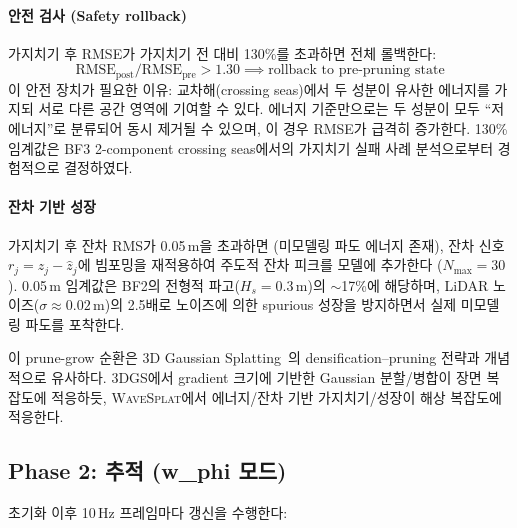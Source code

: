 \documentclass[11pt]{report}
\numberwithin{equation}{chapter}
\numberwithin{figure}{chapter}
\numberwithin{table}{chapter}
\newcommand{\WS}{\textsc{WaveSplat}}
\begin{document}
\paragraph{안전 검사 (Safety rollback)}
가지치기 후 RMSE가 가지치기 전 대비 130\%를 초과하면 전체 롤백한다:
\begin{equation}
  \text{RMSE}_{\text{post}} / \text{RMSE}_{\text{pre}} > 1.30
  \implies \text{rollback to pre-pruning state}
\end{equation}
이 안전 장치가 필요한 이유: 교차해(crossing seas)에서 두 성분이
유사한 에너지를 가지되 서로 다른 공간 영역에 기여할 수 있다.
에너지 기준만으로는 두 성분이 모두 ``저에너지''로 분류되어 동시 제거될 수 있으며,
이 경우 RMSE가 급격히 증가한다.
130\% 임계값은 BF3 2-component crossing seas에서의
가지치기 실패 사례 분석으로부터 경험적으로 결정하였다.

\paragraph{잔차 기반 성장}
가지치기 후 잔차 RMS가 0.05\,m을 초과하면
(미모델링 파도 에너지 존재), 잔차 신호 $r_j = z_j - \hat{z}_j$에 빔포밍을
재적용하여 주도적 잔차 피크를 모델에 추가한다 ($N_{\max}=30$).
0.05\,m 임계값은 BF2의 전형적 파고($H_s = 0.3$\,m)의 $\sim$17\%에 해당하며,
LiDAR 노이즈($\sigma \approx 0.02$\,m)의 2.5배로
노이즈에 의한 spurious 성장을 방지하면서 실제 미모델링 파도를 포착한다.

이 prune-grow 순환은 3D Gaussian Splatting~\citep{Kerbl2023}의
densification--pruning 전략과 개념적으로 유사하다.
3DGS에서 gradient 크기에 기반한 Gaussian 분할/병합이
장면 복잡도에 적응하듯, \WS{}에서 에너지/잔차 기반 가지치기/성장이
해상 복잡도에 적응한다.

\subsection{Phase 2: 추적 (w\_phi 모드)}
\label{sec:tracking}

초기화 이후 10\,Hz 프레임마다 갱신을 수행한다:
\end{document}
